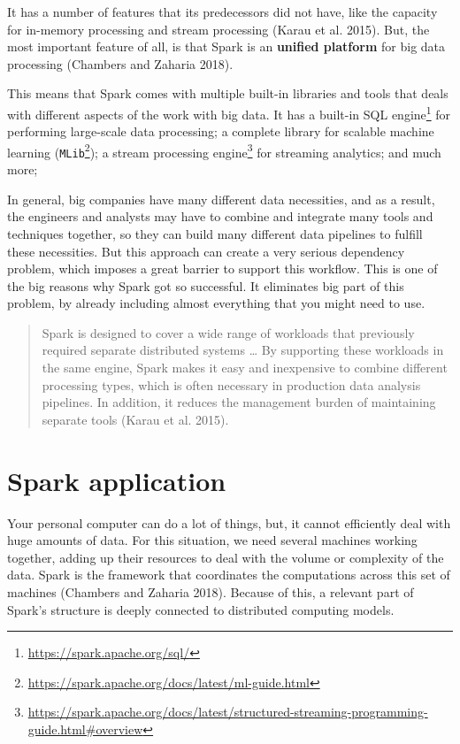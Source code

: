\documentclass[
  11pt,
  letterpaper,
  DIV=11,
  numbers=noendperiod]{scrreprt}
\begin{document}
It has a number of features that its predecessors did not have, like the
capacity for in-memory processing and stream processing (Karau et al.
2015). But, the most important feature of all, is that Spark is an
\textbf{unified platform} for big data processing (Chambers and Zaharia
2018).

This means that Spark comes with multiple built-in libraries and tools
that deals with different aspects of the work with big data. It has a
built-in SQL engine\footnote{\url{https://spark.apache.org/sql/}} for
performing large-scale data processing; a complete library for scalable
machine learning (\texttt{MLib}\footnote{\url{https://spark.apache.org/docs/latest/ml-guide.html}});
a stream processing engine\footnote{\url{https://spark.apache.org/docs/latest/structured-streaming-programming-guide.html\#overview}}
for streaming analytics; and much more;

In general, big companies have many different data necessities, and as a
result, the engineers and analysts may have to combine and integrate
many tools and techniques together, so they can build many different
data pipelines to fulfill these necessities. But this approach can
create a very serious dependency problem, which imposes a great barrier
to support this workflow. This is one of the big reasons why Spark got
so successful. It eliminates big part of this problem, by already
including almost everything that you might need to use.

\begin{quote}
Spark is designed to cover a wide range of workloads that previously
required separate distributed systems \ldots{} By supporting these
workloads in the same engine, Spark makes it easy and inexpensive to
combine different processing types, which is often necessary in
production data analysis pipelines. In addition, it reduces the
management burden of maintaining separate tools (Karau et al. 2015).
\end{quote}

\section{Spark application}\label{spark-application}

Your personal computer can do a lot of things, but, it cannot
efficiently deal with huge amounts of data. For this situation, we need
several machines working together, adding up their resources to deal
with the volume or complexity of the data. Spark is the framework that
coordinates the computations across this set of machines (Chambers and
Zaharia 2018). Because of this, a relevant part of Spark's structure is
deeply connected to distributed computing models.
\end{document}
